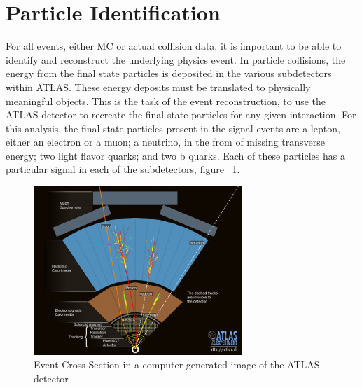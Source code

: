 \section{Particle Identification}
For all events, either MC or actual collision data, it is important to be able to identify and reconstruct the underlying physics event. In particle collisions, the energy from the final state particles is deposited in the various subdetectors within ATLAS. These energy deposits must be translated to physically meaningful objects. This is the task of the event reconstruction, to use the ATLAS detector to recreate the final state particles for any given interaction. For this analysis, the final state particles present in the signal events are a lepton, either an electron or a muon; a neutrino, in the from of missing transverse energy; two light flavor quarks; and two b quarks. Each of these particles has a particular signal in each of the subdetectors, figure ~\ref{fig:crossSec}.

\begin{figure}[h]
\begin{center}
\includegraphics*[width=0.70\textwidth] {figures/layers}
\caption{Event Cross Section in a computer generated image of the ATLAS detector \cite{Pequenao:1096081}}
\label{fig:crossSec}
\end{center}
\end{figure}


